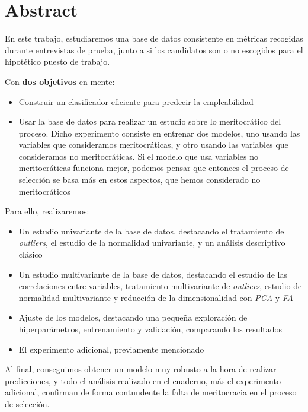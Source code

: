 \section{Abstract}

En este trabajo, estudiaremos una base de datos consistente en métricas recogidas durante entrevistas de prueba, junto a si los candidatos son o no escogidos para el hipotético puesto de trabajo.

Con \textbf{dos objetivos} en mente:

\begin{itemize}
    \item Construir un clasificador eficiente para predecir la empleabilidad
    \item Usar la base de datos para realizar un estudio sobre lo meritocrático del proceso. Dicho experimento consiste en entrenar dos modelos, uno usando las variables que consideramos meritocráticas, y otro usando las variables que consideramos no meritocráticas. Si el modelo que usa variables no meritocráticas funciona mejor, podemos pensar que entonces el proceso de selección se basa más en estos aspectos, que hemos considerado no meritocráticos
\end{itemize}

Para ello, realizaremos:

\begin{itemize}
    \item Un estudio univariante de la base de datos, destacando el tratamiento de \textit{outliers}, el estudio de la normalidad univariante, y un análisis descriptivo clásico
    \item Un estudio multivariante de la base de datos, destacando el estudio de las correlaciones entre variables, tratamiento multivariante de \textit{outliers}, estudio de normalidad multivariante y reducción de la dimensionalidad con \textit{PCA} y \textit{FA}
    \item Ajuste de los modelos, destacando una pequeña exploración de hiperparámetros, entrenamiento y validación, comparando los resultados
    \item El experimento adicional, previamente mencionado
\end{itemize}

Al final, conseguimos obtener un modelo muy robusto a la hora de realizar predicciones, y todo el análisis realizado en el cuaderno, más el experimento adicional, confirman de forma contundente la falta de meritocracia en el proceso de selección.



